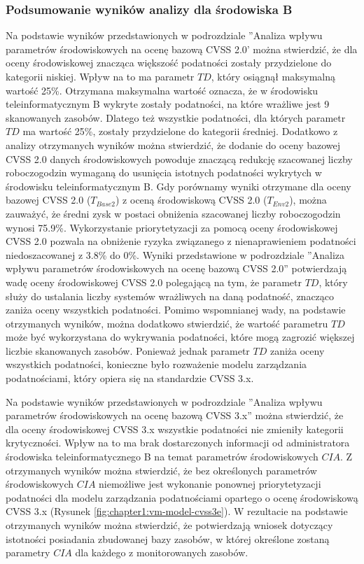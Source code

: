 \subsubsection{Podsumowanie wyników analizy dla środowiska B}
Na podstawie wyników przedstawionych w podrozdziale ''Analiza wpływu parametrów środowiskowych na ocenę bazową CVSS 2.0' można stwierdzić, że dla oceny środowiskowej znacząca większość podatności zostały przydzielone do kategorii niskiej. Wpływ na to ma parametr $TD$, który osiągnął maksymalną wartość 25\%. Otrzymana maksymalna wartość oznacza, że w środowisku teleinformatycznym B wykryte zostały podatności, na które wrażliwe jest 9 skanowanych zasobów. Dlatego też wszystkie podatności, dla których parametr $TD$ ma wartość 25\%, zostały przydzielone do kategorii średniej. Dodatkowo z analizy otrzymanych wyników można stwierdzić, że dodanie do oceny bazowej CVSS 2.0 danych środowiskowych powoduje znaczącą redukcję szacowanej liczby roboczogodzin wymaganą do usunięcia istotnych podatności wykrytych w środowisku teleinformatycznym B. Gdy porównamy wyniki otrzymane dla oceny bazowej CVSS 2.0 ($T_{Base2}$) z oceną środowiskową CVSS 2.0 ($T_{Env2}$), można zauważyć, że średni zysk w postaci obniżenia szacowanej liczby roboczogodzin wynosi 75.9\%. Wykorzystanie priorytetyzacji za pomocą oceny środowiskowej CVSS 2.0 pozwala na obniżenie ryzyka związanego z nienaprawieniem podatności niedoszacowanej z 3.8\% do 0\%. Wyniki przedstawione w podrozdziale ''Analiza wpływu parametrów środowiskowych na ocenę bazową CVSS 2.0'' potwierdzają wadę oceny środowiskowej CVSS 2.0 polegającą na tym, że parametr $TD$, który służy do ustalania liczby systemów wrażliwych na daną podatność, znacząco zaniża oceny wszystkich podatności. Pomimo wspomnianej wady, na podstawie otrzymanych wyników, można dodatkowo stwierdzić, że wartość parametru $TD$ może być wykorzystana do wykrywania podatności, które mogą zagrozić większej liczbie skanowanych zasobów. Ponieważ jednak parametr $TD$ zaniża oceny wszystkich podatności, konieczne było rozważenie modelu zarządzania podatnościami, który opiera się na standardzie CVSS 3.x.

\bigbreak
Na podstawie wyników przedstawionych w podrozdziale ''Analiza wpływu parametrów środowiskowych na ocenę bazową CVSS 3.x'' można stwierdzić, że dla oceny środowiskowej CVSS 3.x wszystkie podatności nie zmieniły kategorii krytyczności. Wpływ na to ma brak dostarczonych informacji od administratora środowiska teleinformatycznego B na temat parametrów środowiskowych $CIA$. Z otrzymanych wyników można stwierdzić, że bez określonych parametrów środowiskowych $CIA$ niemożliwe jest wykonanie ponownej priorytetyzacji podatności dla modelu zarządzania podatnościami opartego o ocenę środowiskową CVSS 3.x (Rysunek \ref{fig:chapter1:vm-model-cvss3e}). W rezultacie na podstawie otrzymanych wyników można stwierdzić, że potwierdzają wniosek dotyczący istotności posiadania zbudowanej bazy zasobów, w której określone zostaną parametry $CIA$ dla każdego z monitorowanych zasobów.


